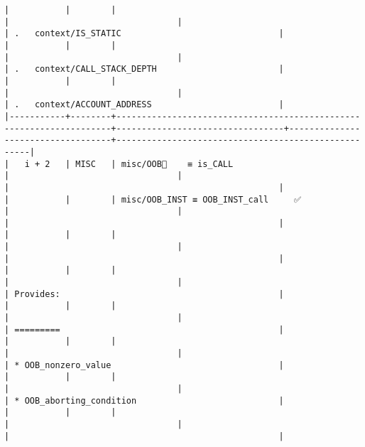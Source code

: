 \documentclass[varwidth=\maxdimen,margin=0.5cm,multi={verbatim}]{standalone}
\begin{document}
\begin{verbatim}
|           |        |                                                                     |                                 |                                   | .   context/IS_STATIC                               |
|           |        |                                                                     |                                 |                                   | .   context/CALL_STACK_DEPTH                        |
|           |        |                                                                     |                                 |                                   | .   context/ACCOUNT_ADDRESS                         |
|-----------+--------+---------------------------------------------------------------------+---------------------------------+-----------------------------------+-----------------------------------------------------|
|   i + 2   | MISC   | misc/OOB🚩    ≡ is_CALL                                             |                                 |                                   |                                                     |
|           |        | misc/OOB_INST ≡ OOB_INST_call     ✅                                |                                 |                                   |                                                     |
|           |        |                                                                     |                                 |                                   |                                                     |
|           |        |                                                                     |                                 |                                   | Provides:                                           |
|           |        |                                                                     |                                 |                                   | =========                                           |
|           |        |                                                                     |                                 |                                   | * OOB_nonzero_value                                 |
|           |        |                                                                     |                                 |                                   | * OOB_aborting_condition                            |
|           |        |                                                                     |                                 |                                   |                                                     |

\end{verbatim}
\end{document}
